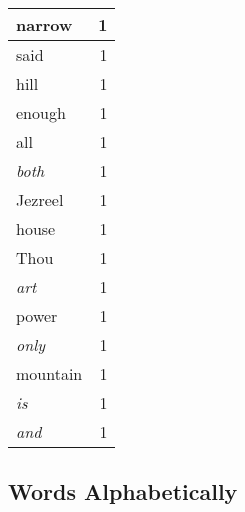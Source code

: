 \begin{center}
\begin{longtable}{l|r}
narrow & 1 \\ \hline
said & 1 \\ \hline
hill & 1 \\ \hline
enough & 1 \\ \hline
all & 1 \\ \hline
\emph{both} & 1 \\ \hline
Jezreel & 1 \\ \hline
house & 1 \\ \hline
Thou & 1 \\ \hline
\emph{art} & 1 \\ \hline
power & 1 \\ \hline
\emph{only} & 1 \\ \hline
mountain & 1 \\ \hline
\emph{is} & 1 \\ \hline
\emph{and} & 1 \\ \hline
\end{longtable}
\end{center}



\normalsize



\subsection{Words Alphabetically}

